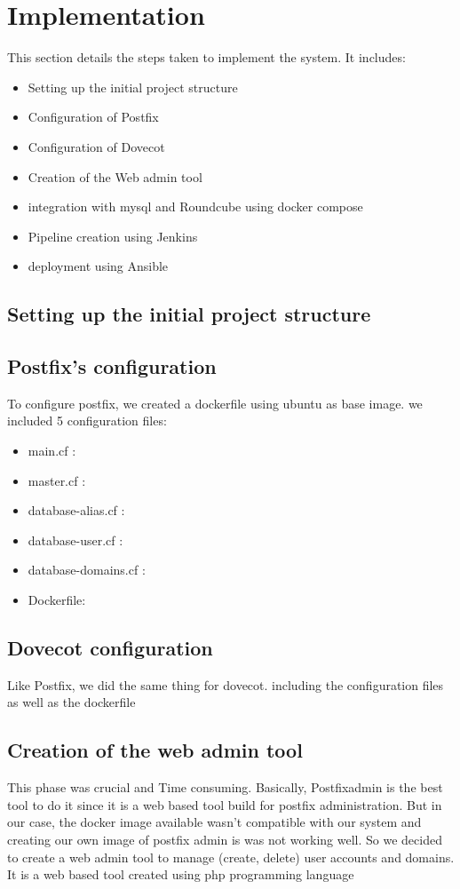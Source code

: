 \documentclass[12pt]{article}
\begin{document}
\section{Implementation}
This section details the steps taken to implement the system. It includes:
\begin{itemize}
    \item Setting up the initial project structure
    \item Configuration of Postfix
    \item Configuration of Dovecot
    \item Creation of the Web admin tool
    \item integration with mysql and Roundcube using docker compose 
    \item Pipeline creation using Jenkins 
    \item deployment using Ansible
\end{itemize}
\subsection{Setting up the initial project structure}
\subsection{Postfix's configuration}
To configure postfix, we created a dockerfile using ubuntu as base image. we included 5 configuration files: 
\begin{itemize}
    \item main.cf :
    \item master.cf :
    \item database-alias.cf :
    \item database-user.cf :
    \item database-domains.cf :
    \item Dockerfile:
\end{itemize}
\subsection{Dovecot configuration}
Like Postfix, we did the same thing for dovecot. including the configuration files as well as the dockerfile
\subsection{Creation of the web admin tool}
This phase was crucial and Time consuming. Basically, Postfixadmin is the best tool to do it since it is a web based tool build for postfix administration. But in our case, the docker image available wasn't compatible with our system and creating our own image of postfix admin is was not working well. So we decided to create a web admin tool to manage (create, delete) user accounts and domains.
It is a web based tool created using php programming language
\end{document}
